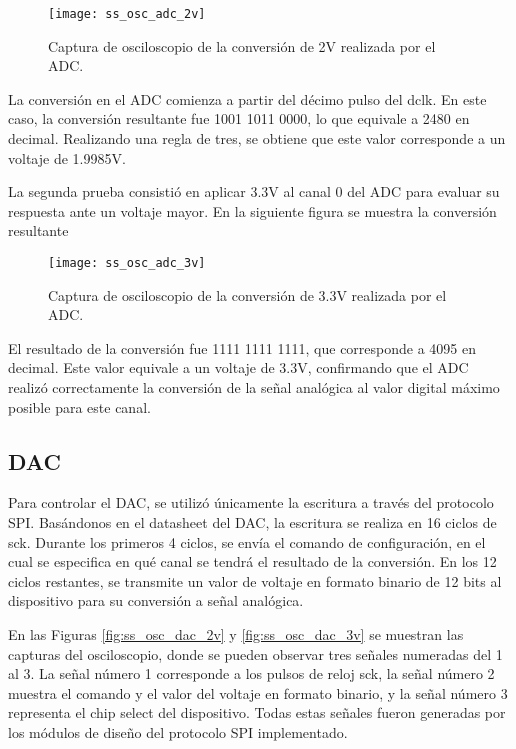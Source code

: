             \begin{figure}[hbtp]
                \centering
                \texttt{[image: ss\_osc\_adc\_2v]}
                \caption{Captura de osciloscopio de la conversión de 2V realizada por el ADC.}
                \label{fig:ss_osc_adc_2v}
            \end{figure} 

La conversión en el ADC comienza a partir del décimo pulso del dclk. En este caso, la conversión resultante fue 1001 1011 0000, lo que equivale a 2480 en decimal. Realizando una regla de tres, se obtiene que este valor corresponde a un voltaje de 1.9985V.


La segunda prueba consistió en aplicar 3.3V al canal 0 del ADC para evaluar su respuesta ante un voltaje mayor. En la siguiente figura se muestra la conversión resultante
            \begin{figure}[hbtp]
                \centering
                \texttt{[image: ss\_osc\_adc\_3v]}
                \caption{Captura de osciloscopio de la conversión de 3.3V realizada por el ADC.}
                \label{fig:ss_osc_adc_3v}
            \end{figure} 

El resultado de la conversión fue 1111 1111 1111, que corresponde a 4095 en decimal. Este valor equivale a un voltaje de 3.3V, confirmando que el ADC realizó correctamente la conversión de la señal analógica al valor digital máximo posible para este canal.
     
\subsection{DAC}
Para controlar el DAC, se utilizó únicamente la escritura a través del protocolo SPI. Basándonos en el datasheet del DAC, la escritura se realiza en 16 ciclos de sck. Durante los primeros 4 ciclos, se envía el comando de configuración, en el cual se especifica en qué canal se tendrá el resultado de la conversión. En los 12 ciclos restantes, se transmite un valor de voltaje en formato binario de 12 bits al dispositivo para su conversión a señal analógica.


En las Figuras \ref{fig:ss_osc_dac_2v} y \ref{fig:ss_osc_dac_3v} se muestran las capturas del osciloscopio, donde se pueden observar tres señales numeradas del 1 al 3. La señal número 1 corresponde a los pulsos de reloj sck, la señal número 2 muestra el comando y el valor del voltaje en formato binario, y la señal número 3 representa el chip select del dispositivo. Todas estas señales fueron generadas por los módulos de diseño del protocolo SPI implementado.


